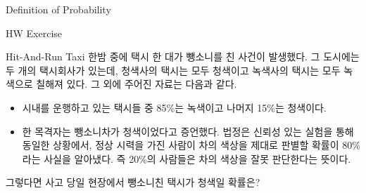 \begin{edXchapter}{Definition of Probability}
\begin{edXsection}{HW Exercise}
\begin{edXvertical}
\begin{edXproblem}{Hit-And-Run Taxi}
한밤 중에 택시 한 대가 뺑소니를 친 사건이 발생했다. 그 도시에는 두 개의 택시회사가 있는데,
청색사의 택시는 모두 청색이고 녹색사의 택시는 모두 녹색으로 칠해져 있다. 그 외에 주어진 
자료는 다음과 같다.
\begin{itemize}
\item 시내를 운행하고 있는 택시들 중 85\%는 녹색이고 나머지 15\%는 청색이다.
\item 한 목격자는 뺑소니차가 청색이었다고 증언했다. 법정은 신뢰성 있는 실험을 통해 동일한 상황에서,
정상 시력을 가진 사람이 차의 색상을 제대로 판별할 확률이 80\%라는 사실을 알아냈다. 즉 20\%의
사람들은 차의 색상을 잘못 판단한다는 뜻이다.
\end{itemize}

그렇다면 사고 당일 현장에서 뺑소니친 택시가 청색일 확률은?
\end{edXproblem}

\end{edXvertical}
\end{edXsection}
\end{edXchapter}










